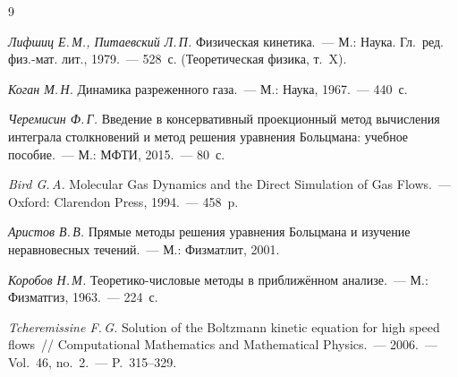 \begin{thebibliography}{9}

 \emph{Лифшиц Е.\,М., Питаевский Л.\,П.} Физическая кинетика.~--- М.: Наука. Гл.~ред.
физ.-мат. лит., 1979.~--- 528~с. (Теоретическая физика, т.~X).

 \emph{Коган М.\,Н.} Динамика разреженного газа.~--- М.: Наука, 1967.~--- 440~с.

 \emph{Черемисин Ф.\,Г.} Введение в консервативный проекционный метод вычисления
интеграла столкновений и метод решения уравнения Больцмана: учебное пособие.~--- М.: МФТИ, 2015.~--- 80~с.

 \emph{Bird G.\,A.} Molecular Gas Dynamics and the Direct Simulation of Gas Flows.~---
Oxford: Clarendon Press, 1994.~--- 458~p.

 \emph{Аристов В.\,В.} Прямые методы решения уравнения Больцмана и изучение неравновесных
течений.~--- М.: Физматлит, 2001.

 \emph{Коробов Н.\,М.} Теоретико-числовые методы в приближённом анализе.~--- М.:
Физматгиз, 1963.~--- 224~с.

 \emph{Tcheremissine F.\,G.} Solution of the Boltzmann kinetic equation for high speed
flows~// Computational Mathematics and Mathematical Physics.~--- 2006.~--- Vol.~46, no.~2.~--- P.~315--329.
\end{thebibliography}

